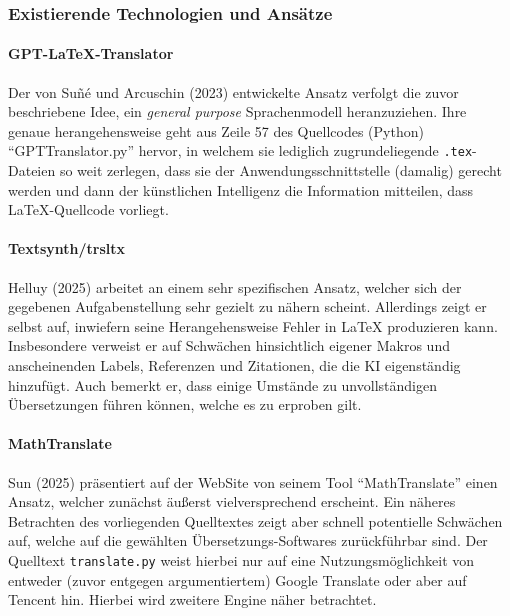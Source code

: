 \subsubsection{Existierende Technologien und Ansätze}
\paragraph*{GPT-LaTeX-Translator}\par
Der von Suñé und Arcuschin (2023) entwickelte Ansatz verfolgt die zuvor beschriebene Idee, ein \textit{general purpose} Sprachenmodell heranzuziehen. Ihre genaue herangehensweise geht aus Zeile 57 des Quellcodes (Python) \enquote{GPTTranslator.py} hervor, in welchem sie lediglich zugrundeliegende \texttt{.tex}-Dateien so weit zerlegen, dass sie der Anwendungsschnittstelle (damalig) gerecht werden und dann der künstlichen Intelligenz die Information mitteilen, dass \LaTeX{}-Quellcode vorliegt.

\paragraph*{Textsynth/trsltx}\par
Helluy (2025) arbeitet an einem sehr spezifischen Ansatz, welcher sich der gegebenen Aufgabenstellung sehr gezielt zu nähern scheint. Allerdings zeigt er selbst auf, inwiefern seine Herangehensweise Fehler in \LaTeX{} produzieren kann. Insbesondere verweist er auf Schwächen hinsichtlich eigener Makros und anscheinenden Labels, Referenzen und Zitationen, die die KI eigenständig hinzufügt. Auch bemerkt er, dass einige Umstände zu unvollständigen Übersetzungen führen können, welche es zu erproben gilt.

\paragraph*{MathTranslate}\par
Sun (2025) präsentiert auf der WebSite von seinem Tool \enquote{MathTranslate} einen Ansatz, welcher zunächst äußerst vielversprechend erscheint. Ein näheres Betrachten des vorliegenden Quelltextes zeigt aber schnell potentielle Schwächen auf, welche auf die gewählten Übersetzungs-Softwares zurückführbar sind. Der Quelltext \texttt{translate.py} weist hierbei nur auf eine Nutzungsmöglichkeit von entweder (zuvor entgegen argumentiertem) Google Translate oder aber auf Tencent hin. Hierbei wird zweitere Engine näher betrachtet.

